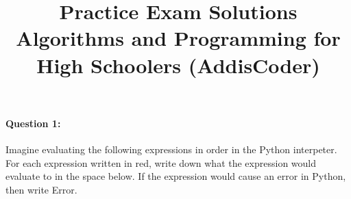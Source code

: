 \documentclass[11pt]{article}
\begin{document}
\title{Practice Exam Solutions\\Algorithms and Programming for High Schoolers
  (AddisCoder)}
\date{}

\maketitle

\paragraph{Question 1:}
Imagine evaluating the following expressions in order in the Python
interpeter.  For each expression written in red, write down what the
expression would evaluate to in the space below.  If the expression
would cause an error in Python, then write Error.
\end{document}
